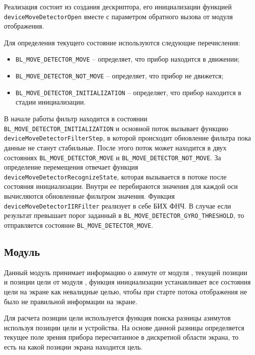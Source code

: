 Реализация состоит из создания дескриптора, его инициализации функцией \lstinline{deviceMoveDetectorOpen} вместе с параметром обратного вызова от модуля
отображения.

Для определения текущего состояние используются следующие перечисления:

\begin{itemize}
    \item \lstinline{BL_MOVE_DETECTOR_MOVE} -- определяет, что прибор находится в движении;
    \item \lstinline{BL_MOVE_DETECTOR_NOT_MOVE} -- определяет, что прибор не движется; 
    \item \lstinline{BL_MOVE_DETECTOR_INITIALIZATION} -- определяет, что прибор находится в стадии инициализации.
\end{itemize}

В начале работы фильтр находится в состоянии \lstinline{BL_MOVE_DETECTOR_INITIALIZATION} и основной поток вызывает функцию
\lstinline{deviceMoveDetectorFilterStep}, в которой происходит обновление фильтра пока данные не станут стабильные.
После этого поток может находится в двух состояниях \lstinline{BL_MOVE_DETECTOR_MOVE} и \lstinline{BL_MOVE_DETECTOR_NOT_MOVE}.
За определение перемещения отвечает функция \lstinline{deviceMoveDetectorRecognizeState}, которая вызывается в потоке после состояния инициализации.
Внутри ее перебираются значения для каждой оси вычисляются обновленные фильтром значения. Функция \lstinline{deviceMoveDetectorIIRFilter} реализует в себе
БИХ ФНЧ. В случае если результат превышает порог заданный в \lstinline{BL_MOVE_DETECTOR_GYRO_THRESHOLD}, то отправляется состояние \lstinline{BL_MOVE_DETECTOR_MOVE}.

\subsection{Модуль \moduleFindTarget}

Данный модуль принимает информацию о азимуте от модуля \moduleOrientationAzimuth, 
текущей позиции и позиции цели от модуля \moduleUart, функция инициализации устанавливает все состояния цели на экране как невалидные
целью, чтобы при старте потока отображения не было не правильной информации на экране. 

Для расчета позиции цели используется функция поиска разницы азимутов используя позиции цели и устройства. На основе данной разницы
определяется текущее поле зрения прибора пересчитанное в дискретной области экрана, то есть на какой позиции экрана находится цель.

